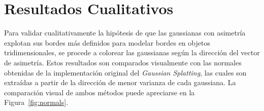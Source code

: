 \begin{table}[H]
    \centering
    \caption{Comparación de calidad entre \textbf{DA-GS} y \textbf{DA-GS con skewness congelado}. Para PSNR y SSIM, valores más altos son mejores ($\uparrow$); para LPIPS y Pts valores más bajos son mejores ($\downarrow$).}
    \label{tab:quality_dags_vs_skewfrozen}
\end{table}

\section{Resultados Cualitativos}

Para validar cualitativamente la hipótesis de que las gaussianas con asimetría explotan sus bordes más definidos para modelar bordes en objetos tridimensionales, se procede a colorear las gaussianas según la dirección del vector de asimetría. Estos resultados son comparados visualmente con las normales obtenidas de la implementación original del \textit{Gaussian Splatting}, las cuales son extraídas a partir de la dirección de menor varianza de cada gaussiana. La comparación visual de ambos métodos puede apreciarse en la Figura~\ref{fig:normals}.

